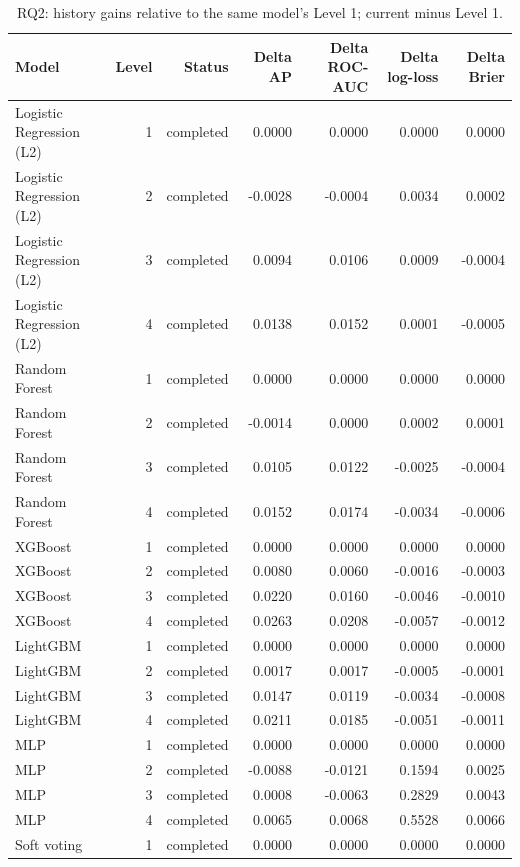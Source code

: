 \begin{table}[htbp]
\centering
\small
\caption{RQ2: history gains relative to the same model's Level 1; current minus Level 1.}
\label{tab:pilot-rq2-history-gains}
\begin{tabular}{lrrrrrr}
\toprule
Model & Level & Status & Delta AP & Delta ROC-AUC & Delta log-loss & Delta Brier \\
\midrule
Logistic Regression (L2) & 1 & completed & 0.0000 & 0.0000 & 0.0000 & 0.0000 \\
Logistic Regression (L2) & 2 & completed & -0.0028 & -0.0004 & 0.0034 & 0.0002 \\
Logistic Regression (L2) & 3 & completed & 0.0094 & 0.0106 & 0.0009 & -0.0004 \\
Logistic Regression (L2) & 4 & completed & 0.0138 & 0.0152 & 0.0001 & -0.0005 \\
Random Forest & 1 & completed & 0.0000 & 0.0000 & 0.0000 & 0.0000 \\
Random Forest & 2 & completed & -0.0014 & 0.0000 & 0.0002 & 0.0001 \\
Random Forest & 3 & completed & 0.0105 & 0.0122 & -0.0025 & -0.0004 \\
Random Forest & 4 & completed & 0.0152 & 0.0174 & -0.0034 & -0.0006 \\
XGBoost & 1 & completed & 0.0000 & 0.0000 & 0.0000 & 0.0000 \\
XGBoost & 2 & completed & 0.0080 & 0.0060 & -0.0016 & -0.0003 \\
XGBoost & 3 & completed & 0.0220 & 0.0160 & -0.0046 & -0.0010 \\
XGBoost & 4 & completed & 0.0263 & 0.0208 & -0.0057 & -0.0012 \\
LightGBM & 1 & completed & 0.0000 & 0.0000 & 0.0000 & 0.0000 \\
LightGBM & 2 & completed & 0.0017 & 0.0017 & -0.0005 & -0.0001 \\
LightGBM & 3 & completed & 0.0147 & 0.0119 & -0.0034 & -0.0008 \\
LightGBM & 4 & completed & 0.0211 & 0.0185 & -0.0051 & -0.0011 \\
MLP & 1 & completed & 0.0000 & 0.0000 & 0.0000 & 0.0000 \\
MLP & 2 & completed & -0.0088 & -0.0121 & 0.1594 & 0.0025 \\
MLP & 3 & completed & 0.0008 & -0.0063 & 0.2829 & 0.0043 \\
MLP & 4 & completed & 0.0065 & 0.0068 & 0.5528 & 0.0066 \\
Soft voting & 1 & completed & 0.0000 & 0.0000 & 0.0000 & 0.0000 \\

\end{tabular}
\end{table}
